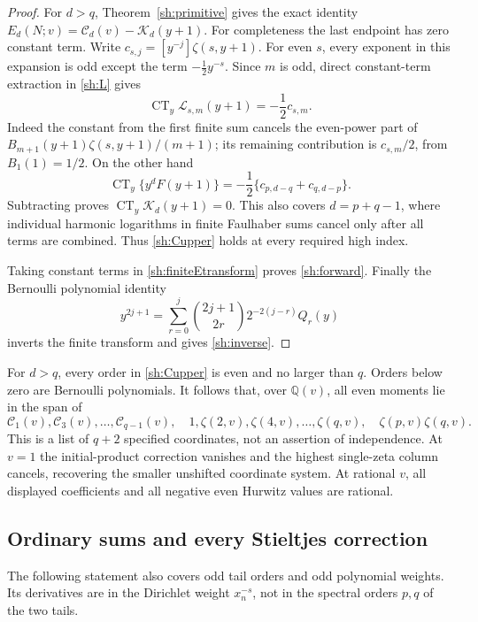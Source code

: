 \documentclass[11pt]{article}
\theoremstyle{definition}
\theoremstyle{remark}
\numberwithin{equation}{section}
\begin{document}
\begin{proof}
For $d>q$, Theorem~\ref{sh:primitive} gives the exact identity
$E_d(N;v)=\mathcal C_d(v)-\mathcal K_d(y+1)$.
For completeness the last endpoint has zero constant term.
Write $c_{s,j}=[y^{-j}]\zeta(s,y+1)$.  For even $s$, every
exponent in this expansion is odd except the term
$-\tfrac12y^{-s}$.  Since $m$ is odd, direct constant-term
extraction in \eqref{sh:L} gives
\[
 \operatorname{CT}_y\mathcal L_{s,m}(y+1)
 =-\frac12c_{s,m}.
\]
Indeed the constant from the first finite sum cancels the
even-power part of $B_{m+1}(y+1)\zeta(s,y+1)/(m+1)$; its
remaining contribution is $c_{s,m}/2$, from
$B_1(1)=1/2$.  On the other hand
\[
 \operatorname{CT}_y\{y^dF(y+1)\}
 =-\frac12\{c_{p,d-q}+c_{q,d-p}\}.
\]
Subtracting proves $\operatorname{CT}_y\mathcal K_d(y+1)=0$.
This also covers $d=p+q-1$, where individual harmonic logarithms
in finite Faulhaber sums cancel only after all terms are combined.
Thus \eqref{sh:Cupper} holds at every required high index.

Taking constant terms in \eqref{sh:finiteEtransform} proves
\eqref{sh:forward}.  Finally the Bernoulli polynomial identity
\[
 y^{2j+1}=\sum_{r=0}^j
       \binom{2j+1}{2r}2^{-2(j-r)}Q_r(y)
\]
inverts the finite transform and gives \eqref{sh:inverse}.
\end{proof}

For $d>q$, every order in \eqref{sh:Cupper} is even and no larger
than $q$.  Orders below zero are Bernoulli polynomials.  It follows
that, over $\mathbb Q(v)$, all even moments lie in the span of
\[
 \mathcal C_1(v),\mathcal C_3(v),\ldots,\mathcal C_{q-1}(v),
 \quad 1,\zeta(2,v),\zeta(4,v),\ldots,\zeta(q,v),
 \quad\zeta(p,v)\zeta(q,v).
\]
This is a list of $q+2$ specified coordinates, not an assertion of
independence.  At $v=1$ the initial-product correction vanishes and
the highest single-zeta column cancels, recovering the smaller
unshifted coordinate system.  At rational $v$, all displayed
coefficients and all negative even Hurwitz values are rational.

\subsection{Ordinary sums and every Stieltjes correction}

The following statement also covers odd tail orders and odd polynomial
weights.  Its derivatives are in the Dirichlet weight $x_n^{-s}$,
not in the spectral orders $p,q$ of the two tails.
\end{document}
